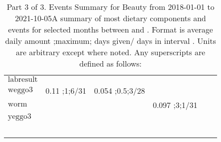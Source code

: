 \begin{table}[H]
\begin{tabular}{|l|r|r|r|r|r|}
$\textrm{labresult}$&&&&&\\
$\textrm{weggo3}$&0.11 ;1;6/31&0.054 ;0.5;3/28&&&\\
$\textrm{worm}$&&&0.097 ;3;1/31&&\\
$\textrm{yeggo3}$&&&&&\\
&&&&&\\
&&&&&\\
&&&&&\\
&&&&&\\
&&&&&\\
\hline
\end{tabular}
\caption{Part 3 of 3.  Events Summary for Beauty   from 2018-01-01 to 2021-10-05A summary of most dietary components and events  for selected months between \mjmdatemin and \mjmdatemax. Format is average daily amount ;maximum; days given/ days in interval . Units are arbitrary except where noted. Any  superscripts are defined as follows:  \mjmsuperscripts}
\end{table}
